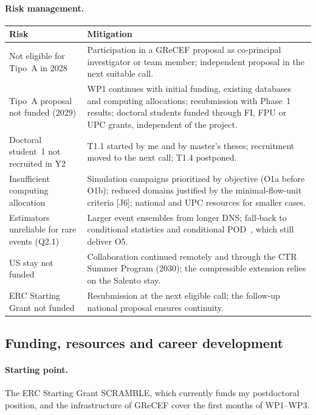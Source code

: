 \documentclass[11pt]{article}
\begin{document}
\paragraph{Risk management.}
\begin{center}\small
\begin{tabularx}{\textwidth}{@{}>{\raggedright\arraybackslash}p{4.4cm}X@{}}
\toprule
\textbf{Risk} & \textbf{Mitigation} \\
\midrule
Not eligible for Tipo~A in 2028 & Participation in a GReCEF proposal as co-principal investigator or team member; independent proposal in the next suitable call. \\
Tipo~A proposal not funded (2029) & WP1 continues with initial funding, existing databases and computing allocations; resubmission with Phase~1 results; doctoral students funded through FI, FPU or UPC grants, independent of the project. \\
Doctoral student~1 not recruited in Y2 & T1.1 started by me and by master's theses; recruitment moved to the next call; T1.4 postponed. \\
Insufficient computing allocation & Simulation campaigns prioritized by objective (O1a before O1b); reduced domains justified by the minimal-flow-unit criteria [J6]; national and UPC resources for smaller cases. \\
Estimators unreliable for rare events (Q2.1) & Larger event ensembles from longer DNS; fall-back to conditional statistics and conditional POD~\cite{Martin2025}, which still deliver O5. \\
US stay not funded & Collaboration continued remotely and through the CTR Summer Program (2030); the compressible extension relies on the Salento stay. \\
ERC Starting Grant not funded & Resubmission at the next eligible call; the follow-up national proposal ensures continuity. \\
\bottomrule
\end{tabularx}
\end{center}

\subsection{Funding, resources and career development}\label{sec:resources}
\paragraph{Starting point.} The ERC Starting Grant SCRAMBLE, which currently funds my
postdoctoral position, and the infrastructure of GReCEF cover the first months of WP1--WP3.
\end{document}
